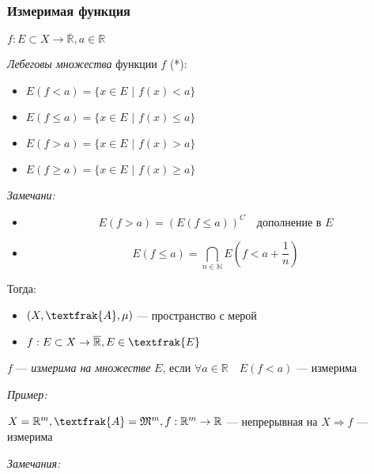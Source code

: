 \documentclass{article}
\def\dbl{\,\,}
\begin{document}
\subsubsection{Измеримая функция}

$f: E \subset X \rightarrow \overline{\mathbb{R}}, a \in \mathbb{R}$

\textit{Лебеговы множества} функции $f$ (*):

\begin{itemize}
    \item $E(f < a) = \{x \in E \dbl | \dbl f(x) < a\}$
    \item $E(f \le a) = \{x \in E \dbl | \dbl f(x) \le a\}$
    \item $E(f > a) = \{x \in E \dbl | \dbl f(x) > a\}$
    \item $E(f \ge a) = \{x \in E \dbl | \dbl f(x) \ge a\}$
\end{itemize}

\textit{Замечани: }

\begin{itemize}
    \item \[E(f > a) = (E(f \le a))^{C} \quad \text{дополнение в }E\]
    \item \[E(f \le a) = \bigcap_{n \in \mathbb{N}} E(f < a + \frac{1}{n})\]
\end{itemize}

Тогда: 

\begin{itemize}
    \item $(X, \textfrak{A}, \mu)$ --- пространство с мерой
    \item $f: E \subset X \rightarrow \overline{\mathbb{R}}, E \in \textfrak{E}$
\end{itemize}

$f$ --- \textit{измерима на множестве} $E$, если $\forall a \in \mathbb{R} \quad E(f < a)$ --- измерима

\textit{Пример:}

$X = \mathbb{R}^m, \textfrak{A} = \mathfrak{M}^m, f: \mathbb{R}^m \rightarrow \mathbb{R}$ --- непрерывная на $X \Rightarrow f$ --- измерима

\textit{Замечания: }
\end{document}

